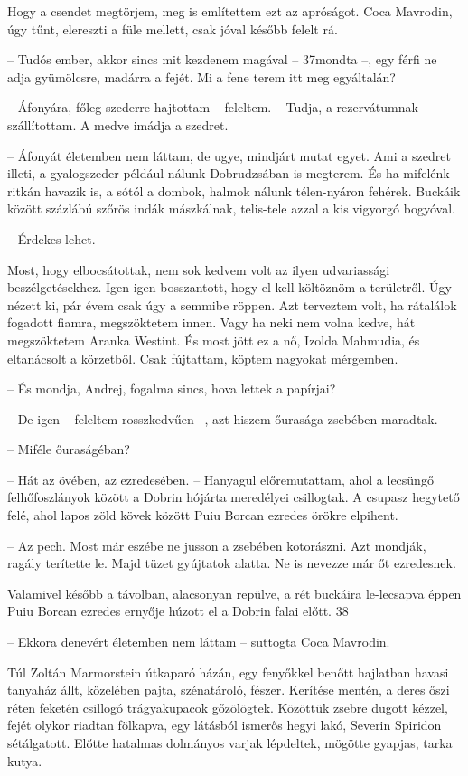 \documentclass{IEEEtran}
\begin{document}
Hogy a csendet megtörjem, meg is említettem ezt az apróságot. Coca Mavrodin,
úgy tűnt, elereszti a füle mellett, csak jóval később felelt rá.

– Tudós ember, akkor sincs mit kezdenem magával – 37mondta –, egy férfi ne
adja gyümölcsre, madárra a fejét. Mi a fene terem itt meg egyáltalán?

– Áfonyára, főleg szederre hajtottam – feleltem. – Tudja, a rezervátumnak
szállítottam. A medve imádja a szedret.

– Áfonyát életemben nem láttam, de ugye, mindjárt mutat egyet. Ami a szedret
illeti, a gyalogszeder például nálunk Dobrudzsában is megterem. És ha mifelénk
ritkán havazik is, a sótól a dombok, halmok nálunk télen-nyáron fehérek.
Buckáik között százlábú szőrös indák mászkálnak, telis-tele azzal a kis
vigyorgó bogyóval.

– Érdekes lehet.

Most, hogy elbocsátottak, nem sok kedvem volt az ilyen udvariassági
beszélgetésekhez. Igen-igen bosszantott, hogy el kell költöznöm a területről.
Úgy nézett ki, pár évem csak úgy a semmibe röppen. Azt terveztem volt, ha
rátalálok fogadott fiamra, megszöktetem innen. Vagy ha neki nem volna kedve,
hát megszöktetem Aranka Westint. És most jött ez a nő, Izolda Mahmudia, és
eltanácsolt a körzetből. Csak fújtattam, köptem nagyokat mérgemben.

– És mondja, Andrej, fogalma sincs, hova lettek a papírjai?

– De igen – feleltem rosszkedvűen –, azt hiszem őurasága zsebében maradtak.

– Miféle őuraságéban?

– Hát az övében, az ezredesében. – Hanyagul előremutattam, ahol a lecsüngő
felhőfoszlányok között a Dobrin hójárta meredélyei csillogtak. A csupasz
hegytető felé, ahol lapos zöld kövek között Puiu Borcan ezredes örökre
elpihent.

– Az pech. Most már eszébe ne jusson a zsebében kotorászni. Azt mondják,
ragály terítette le. Majd tüzet gyújtatok alatta. Ne is nevezze már őt
ezredesnek.

Valamivel később a távolban, alacsonyan repülve, a rét buckáira le-lecsapva
éppen Puiu Borcan ezredes ernyője húzott el a Dobrin falai előtt.
38

– Ekkora denevért életemben nem láttam – suttogta Coca Mavrodin.

Túl Zoltán Marmorstein útkaparó házán, egy fenyőkkel benőtt hajlatban havasi
tanyaház állt, közelében pajta, szénatároló, fészer. Kerítése mentén, a deres
őszi réten feketén csillogó trágyakupacok gőzölögtek. Közöttük zsebre dugott
kézzel, fejét olykor riadtan fölkapva, egy látásból ismerős hegyi lakó,
Severin Spiridon sétálgatott. Előtte hatalmas dolmányos varjak lépdeltek,
mögötte gyapjas, tarka kutya.
\end{document}
